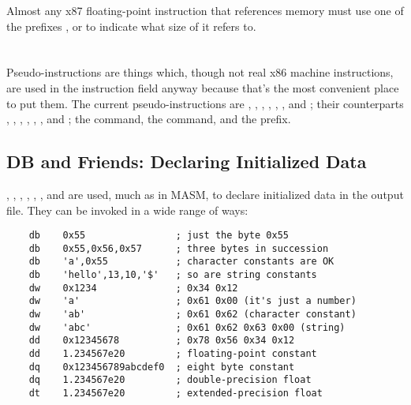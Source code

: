 Almost any x87 floating-point instruction that references memory must
use one of the prefixes ,  or
 to indicate what size of 
it refers to.

\section{}
\label{sec:pseudop}

Pseudo-instructions are things which, though not real x86 machine
instructions, are used in the instruction field anyway because that's
the most convenient place to put them. The current pseudo-instructions
are , , , ,
, ,  and ;
their  counterparts ,
, , ,
, ,  and
; the  command, the 
command, and the  prefix.

\subsection{DB and Friends: Declaring Initialized Data}
\label{subsec:db}

, , , ,
, ,  and 
are used, much as in MASM, to declare initialized data in
the output file. They can be invoked in a wide range of ways:
 
\begin{lstlisting}
	db    0x55                ; just the byte 0x55
	db    0x55,0x56,0x57      ; three bytes in succession
	db    'a',0x55            ; character constants are OK
	db    'hello',13,10,'$'   ; so are string constants
	dw    0x1234              ; 0x34 0x12
	dw    'a'                 ; 0x61 0x00 (it's just a number)
	dw    'ab'                ; 0x61 0x62 (character constant)
	dw    'abc'               ; 0x61 0x62 0x63 0x00 (string)
	dd    0x12345678          ; 0x78 0x56 0x34 0x12
	dd    1.234567e20         ; floating-point constant
	dq    0x123456789abcdef0  ; eight byte constant
	dq    1.234567e20         ; double-precision float
	dt    1.234567e20         ; extended-precision float
\end{lstlisting}

